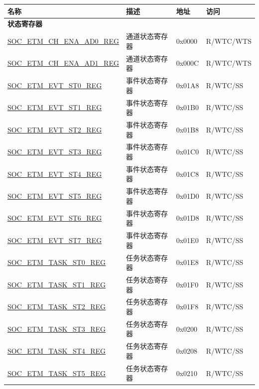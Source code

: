 \begin{longtable}{ | p{6cm} | p{6.4cm} | p{1.3cm} | p{1.8cm} | }
\hline\rowcolor{lightgray}
\textbf{名称} & \textbf{描述} &  \textbf{地址} & \textbf{访问} \\ \hline
\endhead
\multicolumn{4}{|l|}{\textbf{状态寄存器}} \\ \hline
\hyperref[regdesc:SOCETMCHENAAD0REG]{SOC\_ETM\_CH\_ENA\_AD0\_REG} & 通道状态寄存器 & 0x0000 & R/WTC/WTS \\ \hline
\hyperref[regdesc:SOCETMCHENAAD1REG]{SOC\_ETM\_CH\_ENA\_AD1\_REG} & 通道状态寄存器 & 0x000C & R/WTC/WTS \\ \hline
\hyperref[regdesc:SOCETMEVTST0REG]{SOC\_ETM\_EVT\_ST0\_REG} & 事件状态寄存器 & 0x01A8 & R/WTC/SS \\ \hline
\hyperref[regdesc:SOCETMEVTST1REG]{SOC\_ETM\_EVT\_ST1\_REG} & 事件状态寄存器 & 0x01B0 & R/WTC/SS \\ \hline
\hyperref[regdesc:SOCETMEVTST2REG]{SOC\_ETM\_EVT\_ST2\_REG} & 事件状态寄存器 & 0x01B8 & R/WTC/SS \\ \hline
\hyperref[regdesc:SOCETMEVTST3REG]{SOC\_ETM\_EVT\_ST3\_REG} & 事件状态寄存器 & 0x01C0 & R/WTC/SS \\ \hline
\hyperref[regdesc:SOCETMEVTST4REG]{SOC\_ETM\_EVT\_ST4\_REG} & 事件状态寄存器 & 0x01C8 & R/WTC/SS \\ \hline
\hyperref[regdesc:SOCETMEVTST5REG]{SOC\_ETM\_EVT\_ST5\_REG} & 事件状态寄存器 & 0x01D0 & R/WTC/SS \\ \hline
\hyperref[regdesc:SOCETMEVTST6REG]{SOC\_ETM\_EVT\_ST6\_REG} & 事件状态寄存器 & 0x01D8 & R/WTC/SS \\ \hline
\hyperref[regdesc:SOCETMEVTST7REG]{SOC\_ETM\_EVT\_ST7\_REG} & 事件状态寄存器 & 0x01E0 & R/WTC/SS \\ \hline
\hyperref[regdesc:SOCETMTASKST0REG]{SOC\_ETM\_TASK\_ST0\_REG} & 任务状态寄存器 & 0x01E8 & R/WTC/SS \\ \hline
\hyperref[regdesc:SOCETMTASKST1REG]{SOC\_ETM\_TASK\_ST1\_REG} & 任务状态寄存器 & 0x01F0 & R/WTC/SS \\ \hline
\hyperref[regdesc:SOCETMTASKST2REG]{SOC\_ETM\_TASK\_ST2\_REG} & 任务状态寄存器 & 0x01F8 & R/WTC/SS \\ \hline
\hyperref[regdesc:SOCETMTASKST3REG]{SOC\_ETM\_TASK\_ST3\_REG} & 任务状态寄存器 & 0x0200 & R/WTC/SS \\ \hline
\hyperref[regdesc:SOCETMTASKST4REG]{SOC\_ETM\_TASK\_ST4\_REG} & 任务状态寄存器 & 0x0208 & R/WTC/SS \\ \hline
\hyperref[regdesc:SOCETMTASKST5REG]{SOC\_ETM\_TASK\_ST5\_REG} & 任务状态寄存器 & 0x0210 & R/WTC/SS \\ \hline

\end{longtable}
